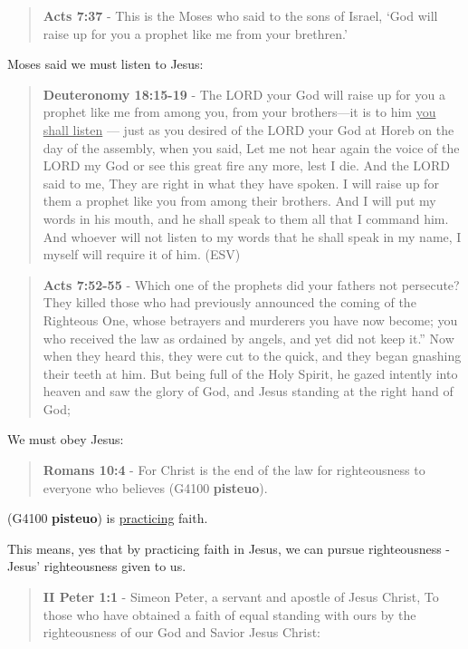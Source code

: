 \documentclass[11pt]{article}
\begin{document}
\begin{quote}
\textbf{Acts 7:37} - This is the Moses who said to the sons of Israel, ‘God will raise up for you a prophet like me from your brethren.’
\end{quote}

Moses said we must listen to Jesus:

\begin{quote}
\textbf{Deuteronomy 18:15-19} - The LORD your God will raise up for you a prophet like me from among you, from your brothers—it is to him \uline{you shall listen} — just as you desired of the LORD your God at Horeb on the day of the assembly, when you said, Let me not hear again the voice of the LORD my God or see this great fire any more, lest I die. And the LORD said to me, They are right in what they have spoken. I will raise up for them a prophet like you from among their brothers. And I will put my words in his mouth, and he shall speak to them all that I command him. And whoever will not listen to my words that he shall speak in my name, I myself will require it of him. (ESV)
\end{quote}

\begin{quote}
\textbf{Acts 7:52-55} - Which one of the prophets did your fathers not persecute? They killed those who had previously announced the coming of the Righteous One, whose betrayers and murderers you have now become; you who received the law as ordained by angels, and yet did not keep it.” Now when they heard this, they were cut to the quick, and they began gnashing their teeth at him.  But being full of the Holy Spirit, he gazed intently into heaven and saw the glory of God, and Jesus standing at the right hand of God;
\end{quote}

We must obey Jesus:

\begin{quote}
\textbf{Romans 10:4} - For Christ is the end of the law for righteousness to everyone who believes (G4100 \textbf{pisteuo}).
\end{quote}

(G4100 \textbf{pisteuo}) is \uline{practicing} faith.

This means, yes that by practicing faith in Jesus, we can pursue righteousness - Jesus' righteousness given to us.

\begin{quote}
\textbf{II Peter 1:1} - Simeon Peter, a servant and apostle of Jesus Christ, To those who have obtained a faith of equal standing with ours by the righteousness of our God and Savior Jesus Christ:
\end{quote}
\end{document}
